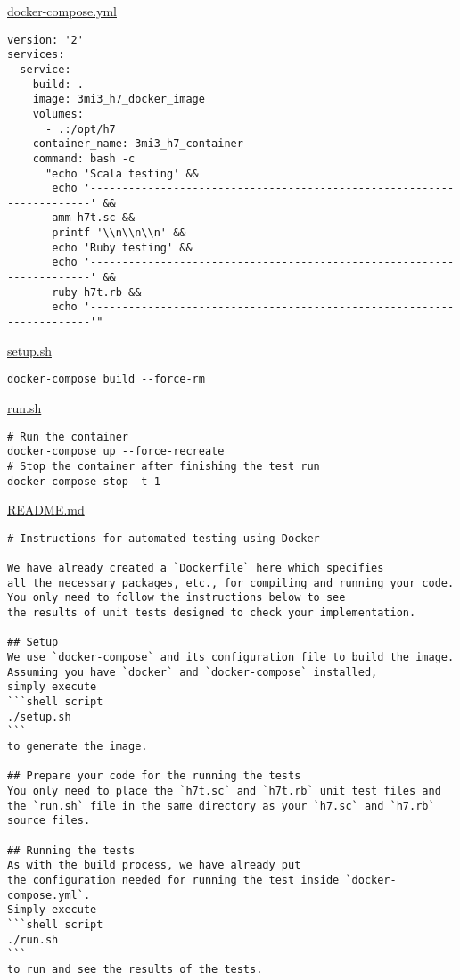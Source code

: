 \documentclass[11pt]{article}
\begin{document}
\href{./testing/h7/docker-compose.yml}{docker-compose.yml}
\begin{verbatim}
version: '2'
services:
  service:
    build: .
    image: 3mi3_h7_docker_image
    volumes:
      - .:/opt/h7
    container_name: 3mi3_h7_container
    command: bash -c
      "echo 'Scala testing' &&
       echo '----------------------------------------------------------------------' &&
       amm h7t.sc &&
       printf '\\n\\n\\n' &&
       echo 'Ruby testing' &&
       echo '----------------------------------------------------------------------' &&
       ruby h7t.rb &&
       echo '----------------------------------------------------------------------'"
\end{verbatim}

\href{./testing/h5/setup.sh}{setup.sh}
\begin{verbatim}
docker-compose build --force-rm
\end{verbatim}

\href{./testing/h5/run.sh}{run.sh}
\begin{verbatim}
# Run the container
docker-compose up --force-recreate
# Stop the container after finishing the test run
docker-compose stop -t 1
\end{verbatim}

\href{./testing/h5/README.md}{README.md}
\begin{verbatim}
# Instructions for automated testing using Docker

We have already created a `Dockerfile` here which specifies
all the necessary packages, etc., for compiling and running your code.
You only need to follow the instructions below to see 
the results of unit tests designed to check your implementation.

## Setup
We use `docker-compose` and its configuration file to build the image.
Assuming you have `docker` and `docker-compose` installed,
simply execute
```shell script
./setup.sh
```
to generate the image.

## Prepare your code for the running the tests
You only need to place the `h7t.sc` and `h7t.rb` unit test files and
the `run.sh` file in the same directory as your `h7.sc` and `h7.rb` source files.

## Running the tests
As with the build process, we have already put
the configuration needed for running the test inside `docker-compose.yml`.
Simply execute
```shell script
./run.sh
```
to run and see the results of the tests.
\end{verbatim}
\end{document}
